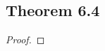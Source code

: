 \documentclass[../../main.tex]{subfiles}
\begin{document}
\subsection{Theorem 6.4}
\begin{wts}

\end{wts}
\begin{proof}

\end{proof}
\end{document}
